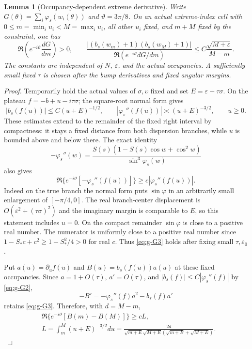 \documentclass[11pt]{article}
\numberwithin{equation}{section}
\newtheorem{lemma}[theorem]{Lemma}
\theoremstyle{remark}\newtheorem{remark}[theorem]{Remark}
\begin{document}
\begin{lemma}[Occupancy-dependent extreme derivative]\label{lem:global-coarea}
Write
$G(\theta)=\sum_i\varphi_s(w_i(\theta))$ and
$\vartheta=3\pi/8$.  On an actual extreme-index cell with
$0\le m=\min_i u_i<M=\max_i u_i$, all other $u_i$ fixed,
and $m+M$ fixed by the constraint, one has
\begin{equation}\label{eq:g-G1}
\Re\left(e^{-i\vartheta}\frac{dG}{dm}\right)>0,
 \qquad
 \frac{|(b_s(w_m)+1)(b_s(w_M)+1)|}
 {\Re(e^{-i\vartheta}dG/dm)}
 \le C\frac{\sqrt{M+\varepsilon}}{M-m}.
\end{equation}
The constants are independent of $N$, $\varepsilon$, and the
actual occupancies.  A sufficiently small fixed $\tau$ is chosen
after the bump derivatives and fixed angular margins.
\end{lemma}
\begin{proof}
Temporarily hold the actual values of $\sigma,\upsilon$ fixed
and set $E=\varepsilon+\tau\sigma$.
On the plateau $f=-b+u-i\tau\sigma$; the square-root normal form gives
\begin{equation}\label{eq:g-G2}
|b_s(f(u))|\le C(u+E)^{-1/2},\qquad
 |\varphi_s''(f(u))|\asymp(u+E)^{-3/2},\qquad u\ge0.
\end{equation}
These estimates extend to the remainder of the fixed right
interval by compactness: it stays a fixed distance from both
dispersion branches, while $u$ is bounded above and below there.
The exact identity
\[
 -\varphi_s''(w)
 =\frac{S(s)(1-S(s)\cos w+\cos^2w)}{\sin^3\varphi_s(w)}
\]
also gives
\begin{equation}\label{eq:g-G3}
\Re\{e^{-i\vartheta}[-\varphi_s''(f(u))]\}
 \ge c|\varphi_s''(f(u))|.
\end{equation}
Indeed on the true branch the normal form puts
$\sin\varphi$ in an arbitrarily small enlargement of
$[-\pi/4,0]$.  The real branch-center displacement is
$O(\varepsilon^2+(\tau\sigma)^2)$ and the imaginary margin is
comparable to $E$, so this statement includes $u=0$.
On the compact remainder $\sin\varphi$ is close to a positive
real number.  The numerator is uniformly close to a positive
real number since
$1-S_*c+c^2\ge1-S_*^2/4>0$ for real $c$.
Thus \eqref{eq:g-G3} holds after fixing small $\tau,\varepsilon_0$.

Put $a(u)=\partial_u f(u)$ and $B(u)=b_s(f(u))a(u)$ at these
fixed occupancies.  Since $a=1+O(\tau)$,
$a'=O(\tau)$, and $|b_s(f)|\le C|\varphi_s''(f)|$ by \eqref{eq:g-G2},
\[
 -B'=-\varphi_s''(f)a^2-b_s(f)a'
\]
retains \eqref{eq:g-G3}.  Therefore, with $d=M-m$,
\begin{equation}\label{eq:g-G4}
\begin{aligned}
 &\Re\{e^{-i\vartheta}[B(m)-B(M)]\}\ge cL,\\
 &L=\int_m^M(u+E)^{-3/2}du
 =\frac{2d}{\sqrt{m+E}\sqrt{M+E}
 (\sqrt{m+E}+\sqrt{M+E})}.
\end{aligned}
\end{equation}


\end{proof}
\end{document}
